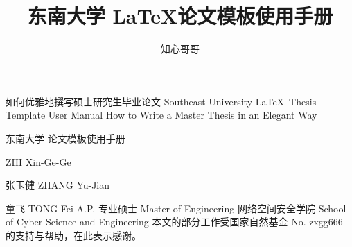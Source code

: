 \documentclass[algorithmlist,figurelist,tablelist,nomlist]{template/seumasterthesis}
\begin{document}

\title
    {东南大学 \LaTeX 论文模板使用手册}        %
    {如何优雅地撰写硕士研究生毕业论文}         %
    {Southeast University \LaTeX ~Thesis Template User Manual}  %
    {How to Write a Master Thesis in an Elegant Way}            %

\spine
    {东南大学  论文模板使用手册} 
    {}                                                               

\author
    {知心哥哥}                        %
    {ZHI Xin-Ge-Ge}                  %

\advisor
    {张玉健}                %
    {ZHANG Yu-Jian}        %
    {}                     %
    
\coadvisor                 %
    {童飞}                  %
    {TONG Fei}             %
    {A.P.}                 %
\degreetype                        %
    {专业硕士}
    {Master of Engineering}
\authorizedate{}                  %
\committeechair{}               %
\reviewer{}{}            %
\department                        %
    {网络空间安全学院}
    {School of Cyber Science and Engineering}
\seuthesisthanks                %
    {本文的部分工作受国家自然基金 No. zxgg666 的支持与帮助，在此表示感谢。}
\end{document}
